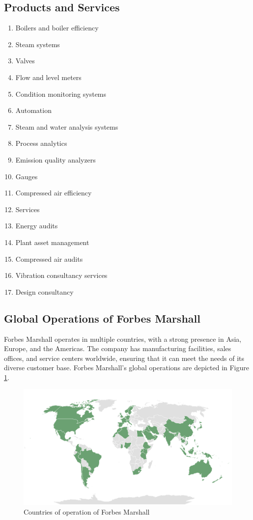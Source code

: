 \subsection{Products and Services}
\begin{enumerate}
    \item Boilers and boiler efficiency
    \item Steam systems
    \item Valves
    \item Flow and level meters
    \item Condition monitoring systems
    \item Automation
    \item Steam and water analysis systems
    \item Process analytics
    \item Emission quality analyzers
    \item Gauges
    \item Compressed air efficiency
    \item Services
    \item Energy audits
    \item Plant asset management
    \item Compressed air audits
    \item Vibration consultancy services
    \item Design consultancy
\end{enumerate}


\subsection{Global Operations of Forbes Marshall}
Forbes Marshall operates in multiple countries, with a strong presence in Asia, Europe, and the Americas. The company has manufacturing facilities, sales offices, and service centers worldwide, ensuring that it can meet the needs of its diverse customer base. Forbes Marshall's global operations are depicted in Figure \ref{fig:world_operations}.

\begin{figure}[h!]
    \centering
    \includegraphics[width=0.8\linewidth]{figs/world_operations.png}
    \caption{Countries of operation of Forbes Marshall}
    \label{fig:world_operations}
\end{figure}

